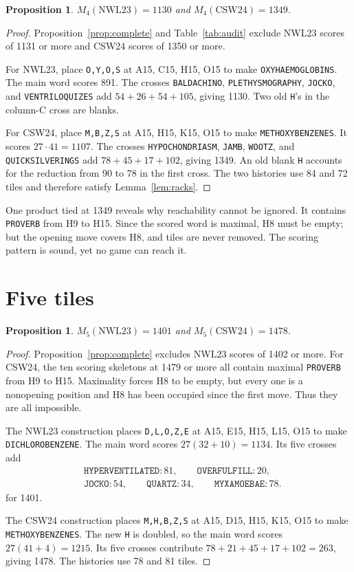 \documentclass{article}
\theoremstyle{plain}
\newtheorem{proposition}[theorem]{Proposition}
\newcommand{\word}[1]{\texttt{#1}}
\begin{document}
\begin{proposition}\label{prop:four}
$M_4(\mathrm{NWL23})=1130$ and $M_4(\mathrm{CSW24})=1349$.
\end{proposition}
\begin{proof}
Proposition~\ref{prop:complete} and Table~\ref{tab:audit} exclude NWL23 scores
of 1131 or more and CSW24 scores of 1350 or more.

For NWL23, place \word{O,Y,O,S} at A15, C15, H15, O15 to make
\word{OXYHAEMOGLOBINS}. The main word scores 891. The crosses
\word{BALDACHINO}, \word{PLETHYSMOGRAPHY}, \word{JOCKO}, and
\word{VENTRILOQUIZES} add $54+26+54+105$, giving 1130. Two old \word{H}'s in
the column-C cross are blanks.

For CSW24, place \word{M,B,Z,S} at A15, H15, K15, O15 to make
\word{METHOXYBENZENES}. It scores $27\cdot41=1107$. The crosses
\word{HYPOCHONDRIASM}, \word{JAMB}, \word{WOOTZ}, and
\word{QUICKSILVERINGS} add $78+45+17+102$, giving 1349. An old blank
\word{H} accounts for the reduction from 90 to 78 in the first cross. The two
histories use 84 and 72 tiles and therefore satisfy Lemma~\ref{lem:racks}.
\end{proof}

One product tied at 1349 reveals why reachability cannot be ignored. It contains
\word{PROVERB} from H9 to H15. Since the scored word is maximal, H8 must be
empty; but the opening move covers H8, and tiles are never removed. The scoring
pattern is sound, yet no game can reach it.

\section{Five tiles}

\begin{proposition}\label{prop:five}
$M_5(\mathrm{NWL23})=1401$ and $M_5(\mathrm{CSW24})=1478$.
\end{proposition}
\begin{proof}
Proposition~\ref{prop:complete} excludes NWL23 scores of 1402 or more. For
CSW24, the ten scoring skeletons at 1479 or more all contain maximal
\word{PROVERB} from H9 to H15. Maximality forces H8 to be empty, but every one
is a nonopening position and H8 has been occupied since the first move. Thus
they are all impossible.

The NWL23 construction places \word{D,L,O,Z,E} at A15, E15, H15, L15, O15 to
make \word{DICHLOROBENZENE}. The main word scores $27(32+10)=1134$. Its five
crosses add
\[
 \begin{aligned}
 &\word{HYPERVENTILATED}:81,\qquad \word{OVERFULFILL}:20,\\
 &\word{JOCKO}:54,\qquad \word{QUARTZ}:34,\qquad
 \word{MYXAMOEBAE}:78.
 \end{aligned}
\]
for 1401.

The CSW24 construction places \word{M,H,B,Z,S} at A15, D15, H15, K15, O15 to
make \word{METHOXYBENZENES}. The new \word{H} is doubled, so the main word
scores $27(41+4)=1215$. Its five crosses contribute
$78+21+45+17+102=263$, giving 1478. The histories use 78 and 81 tiles.
\end{proof}
\end{document}
